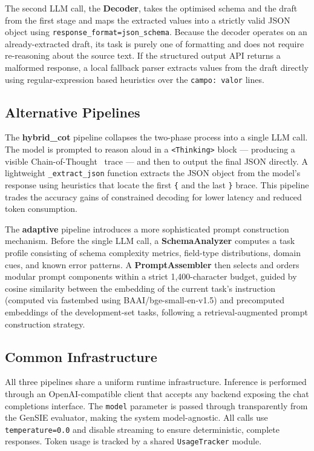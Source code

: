 \documentclass[onecolumn]{ceurart}
\begin{document}
The second LLM call, the \textbf{Decoder}, takes the optimised schema and the
draft from the first stage and maps the extracted values into a strictly valid
JSON object using \texttt{response\_format=json\_schema}. Because the decoder
operates on an already-extracted draft, its task is purely one of formatting and
does not require re-reasoning about the source text. If the structured output
API returns a malformed response, a local fallback parser extracts values from
the draft directly using regular-expression based heuristics over the
\texttt{campo: valor} lines.

\subsection{Alternative Pipelines}

The \textbf{hybrid\_cot} pipeline collapses the two-phase process into a single
LLM call. The model is prompted to reason aloud in a \texttt{<Thinking>}
block --- producing a visible Chain-of-Thought~\citep{wei2022chain} trace ---
and then to output the final JSON directly. A lightweight
\texttt{\_extract\_json} function extracts the JSON object from the model's
response using heuristics that locate the first \texttt{\{} and the last
\texttt{\}} brace. This pipeline trades the accuracy gains of constrained
decoding for lower latency and reduced token consumption.

The \textbf{adaptive} pipeline introduces a more sophisticated prompt
construction mechanism. Before the single LLM call, a \textbf{SchemaAnalyzer}
computes a task profile consisting of schema complexity metrics, field-type
distributions, domain cues, and known error patterns. A
\textbf{PromptAssembler} then selects and orders modular prompt components
within a strict 1,400-character budget, guided by cosine similarity between the
embedding of the current task's instruction (computed via fastembed using
BAAI/bge-small-en-v1.5) and precomputed embeddings of the development-set
tasks, following a retrieval-augmented prompt construction strategy.

\subsection{Common Infrastructure}

All three pipelines share a uniform runtime infrastructure. Inference is
performed through an OpenAI-compatible client that accepts any backend exposing
the chat completions interface. The \texttt{model} parameter is passed through
transparently from the GenSIE evaluator, making the system model-agnostic. All
calls use \texttt{temperature=0.0} and disable streaming to ensure
deterministic, complete responses. Token usage is tracked by a shared
\texttt{UsageTracker} module.
\end{document}
